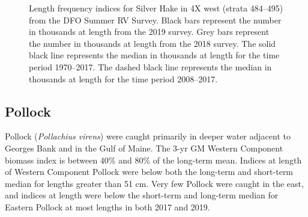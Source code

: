 \documentclass[11pt]{book}
\begin{document}
\begin{figure}[htb]

{\centering {} 

}

\caption{Length frequency indices for Silver Hake in 4X west (strata 484--495) from the DFO Summer RV Survey. Black bars represent the number in thousands at length from the 2019 survey. Grey bars represent the number in thousands at length from the 2018 survey. The solid black line represents the median in thousands at length for the time period 1970--2017. The dashed black line represents the median in thousands at length for the time period 2008--2017.}\label{fig:30-fig-silverhake-lengthfreq4X}
\end{figure}
\clearpage

\hypertarget{pollock}{%
\subsection{Pollock}\label{pollock}}

Pollock (\emph{Pollachius virens}) were caught primarily in deeper water adjacent to Georges Bank and in the Gulf of Maine. The 3-yr GM Western Component biomass index is between 40\% and 80\% of the long-term mean. Indices at length of Western Component Pollock were below both the long-term and short-term median for lengths greater than 51 cm. Very few Pollock were caught in the east, and indices at length were below the short-term and long-term median for Eastern Pollock at most lengths in both 2017 and 2019.
\end{document}
